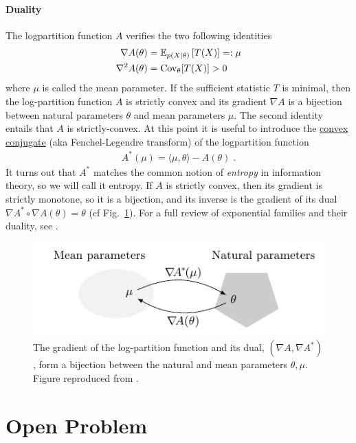 \documentclass[twoside]{article}
\newcommand*{\expect}[2][]{\ensuremath{\mathbb{E}_{#1} \left[ #2 \right] }} %
\newcommand{\logpart}{A}
\newcommand{\conj}{\logpart^*}
\newcommand{\natp}{\theta}
\newcommand{\meanp}{\mu}
\begin{document}
\paragraph{Duality}
The logpartition function $\logpart$ verifies the two following identities
\begin{align}
    \nabla\logpart(\natp) &=  \expect[p(X|\natp)]{T(X)} =: \meanp \\
    \nabla^2 \logpart(\natp) &= \Cov_\natp[T(X)] > 0
\end{align}
where $\meanp$ is called the mean parameter.
If the sufficient statistic $T$ is minimal, then the log-partition function $\logpart$ is strictly convex and its gradient $\nabla \logpart$ is a bijection between natural parameters $\natp$ and mean parameters $\mu$.
The second identity entails that $\logpart$ is strictly-convex. 
At this point it is useful to introduce the \href{https://en.wikipedia.org/wiki/Convex_conjugate}{convex conjugate} (aka Fenchel-Legendre transform) of the logpartition function
\begin{align}
	\conj(\mu) = \langle \mu, \natp \rangle - \logpart(\natp) \; .
\end{align}
It turns out that $\conj$ matches the common notion of \textit{entropy} in information theory, so we will call it entropy.
If $\logpart$ is strictly convex, then its gradient is strictly monotone, so it is a bijection, and its inverse is the gradient of its dual $\nabla\conj \circ \nabla\logpart(\natp) = \natp$ (cf Fig.~\ref{fig:duality}).
For a full review of exponential families and their duality, see \citet[Chapter 3]{wainwright2008graphical}.
\begin{figure}[ht]
	\centering
	\includegraphics{duality}
	\caption{The gradient of the log-partition function and its dual, $(\nabla \logpart, \nabla \conj)$, form a bijection between the natural and mean parameters $\natp, \meanp$. Figure reproduced from \citet{kunstner2020homeomorphic}.}
	\label{fig:duality}
\end{figure}


\section{Open Problem}
\end{document}
